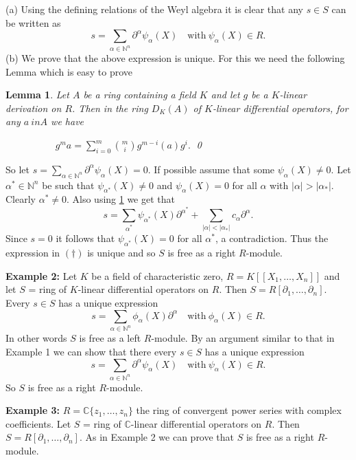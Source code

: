 \documentclass{amsart}
\theoremstyle{plain}
\newtheorem{lemma}[theorem]{Lemma}
\theoremstyle{definition}
\theoremstyle{remark}
\numberwithin{equation}{theorem}
\begin{document}
(a) Using the defining relations of the Weyl algebra it is clear that any $s \in S$ can be written as
\begin{equation*}
s = \sum_{\alpha \in \mathbb{N}^n} {\mathbb{\partial}}^\alpha \psi_{\alpha}(X) \quad \text{with}\ \psi_{\alpha}(X) \in R. \tag{$\dagger$}
\end{equation*}
(b) We prove that the above expression is unique. For this we need the following Lemma which is easy to prove
\begin{lemma}\label{temp}
Let $A$ be a ring containing a field $K$ and let $g$ be a $K$-linear derivation on $R$. Then in the ring $D_K(A)$
of $K$-linear differential operators, for any $a\ in A$ we have

$\displaystyle{\quad \ \ \ \ \ \ \ \ \ \ \ \ \ \ \ \ \ \ \ g^m a = \sum_{i = 0}^{m} \binom{m}{i}g^{m-i}(a)g^i.}$
\qed
\end{lemma}
So let $s = \sum_{\alpha \in \mathbb{N}^n} {\mathbb{\partial}}^\alpha \psi_{\alpha}(X) = 0$. If possible assume that some $\psi_{\alpha}(X) \neq 0$. Let $\alpha^* \in \mathbb{N}^n$ be such that $\psi_{\alpha^*}(X) \neq 0$ and $\psi_{\alpha}(X) = 0 $ for all $\alpha$ with $|\alpha| > |\alpha_*|$. Clearly $\alpha^* \neq 0$. Also using \ref{temp}
we get that
\[
s = \sum_{\alpha^*}  \psi_{\alpha^*}(X){\mathbb{\partial}}^{\alpha^*} + \sum_{|\alpha| < |\alpha_*|}c_\alpha  {\mathbb{\partial}}^\alpha.
\]
Since $s = 0$ it follows that  $\psi_{\alpha^*}(X) = 0$ for all $\alpha^*$, a contradiction. Thus the expression in $(\dagger)$ is unique and so $S$ is free as a right $R$-module.

\textbf{Example 2:} Let $K$ be a field of characteristic zero, $R = K[[X_1,\ldots,X_n]]$ and  let $S$ = ring of $K$-linear differential operators on $R$. Then $S = R[\partial_1,\ldots,\partial_n]$.
Every $s \in S$ has a unique expression
\[
s = \sum_{\alpha \in \mathbb{N}^n} \phi_{\alpha}(X){\mathbb{\partial}}^\alpha \quad \text{with}\ \phi_{\alpha}(X) \in R.
\]
In other words $S$ is free as a left $R$-module. By an argument similar to that in Example 1 we can show that
there every $s \in S$ has a unique expression
\[
s = \sum_{\alpha \in \mathbb{N}^n} {\mathbb{\partial}}^\alpha \psi_{\alpha}(X) \quad \text{with}\ \psi_{\alpha}(X) \in R.
\]
So $S$ is  free as a right $R$-module.

\textbf{Example 3:} $R = \mathbb{C}\{z_1,\ldots,z_n\}$ the ring of convergent power series with complex coefficients. Let $S$ = ring of $\mathbb{C}$-linear differential operators on $R$. Then $S = R[\partial_1,\ldots,\partial_n]$. As in Example 2 we can prove that $S$ is  free as a right $R$-module.
\end{document}
